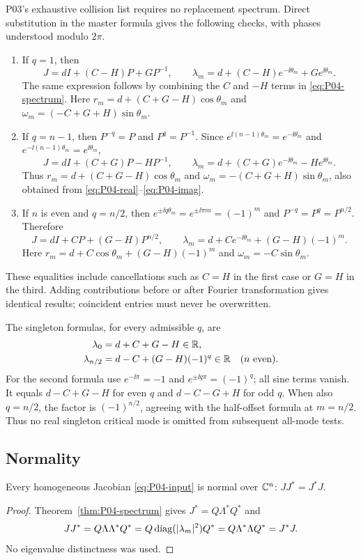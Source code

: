 P03's exhaustive collision list requires no replacement spectrum.
Direct substitution in the master formula gives the following
checks, with phases understood modulo $2\pi$.
\begin{enumerate}[label=(\roman*),leftmargin=*]
\item If $q=1$, then
\[
 J=dI+(C-H)P+GP^{-1},\qquad
 \lambda_m=d+(C-H)e^{-\ii\theta_m}+Ge^{\ii\theta_m}.
\]
The same expression follows by combining the $C$ and $-H$ terms
in \eqref{eq:P04-spectrum}. Here
$r_m=d+(C+G-H)\cos\theta_m$ and
$\omega_m=(-C+G+H)\sin\theta_m$.
\item If $q=n-1$, then $P^{-q}=P$ and $P^q=P^{-1}$.
Since $e^{\ii(n-1)\theta_m}=e^{-\ii\theta_m}$ and
$e^{-\ii(n-1)\theta_m}=e^{\ii\theta_m}$,
\[
 J=dI+(C+G)P-HP^{-1},\qquad
 \lambda_m=d+(C+G)e^{-\ii\theta_m}-He^{\ii\theta_m}.
\]
Thus $r_m=d+(C+G-H)\cos\theta_m$ and
$\omega_m=-(C+G+H)\sin\theta_m$, also obtained from
\eqref{eq:P04-real}--\eqref{eq:P04-imag}.
\item If $n$ is even and $q=n/2$, then
$e^{\pm\ii q\theta_m}=e^{\pm\ii\pi m}=(-1)^m$ and
$P^{-q}=P^q=P^{n/2}$. Therefore
\[
 J=dI+CP+(G-H)P^{n/2},\qquad
 \lambda_m=d+Ce^{-\ii\theta_m}+(G-H)(-1)^m.
\]
Here $r_m=d+C\cos\theta_m+(G-H)(-1)^m$ and
$\omega_m=-C\sin\theta_m$.
\end{enumerate}
These equalities include cancellations such as $C=H$ in the first
case or $G=H$ in the third. Adding contributions before or after
Fourier transformation gives identical results; coincident entries
must never be overwritten.

The singleton formulas, for every admissible $q$, are
\begin{align}
 \lambda_0&=d+C+G-H\in\mathbb{R},\label{eq:P04-zero-mode}\\
 \lambda_{n/2}&=d-C+(G-H)(-1)^q\in\mathbb{R}
       \quad(n\text{ even}).\label{eq:P04-half-mode}
\end{align}
For the second formula use $e^{-\ii\pi}=-1$ and
$e^{\pm\ii q\pi}=(-1)^q$; all sine terms vanish.
It equals $d-C+G-H$ for even $q$ and $d-C-G+H$ for odd $q$.
When also $q=n/2$, the factor is $(-1)^{n/2}$, agreeing with the
half-offset formula at $m=n/2$. Thus no real singleton critical
mode is omitted from subsequent all-mode tests.

\subsection{Normality}
\label{slot:P04-2}

\begin{proposition}[Normality]
\label{prop:P04-normality}
Every homogeneous Jacobian \eqref{eq:P04-input} is normal over
$\mathbb{C}^n$: $JJ^*=J^*J$.
\end{proposition}
\begin{proof}
Theorem~\ref{thm:P04-spectrum} gives $J^*=Q\Lambda^*Q^*$ and
\[
 JJ^*=Q\Lambda\Lambda^*Q^*
       =Q\operatorname{diag}(|\lambda_m|^2)Q^*
       =Q\Lambda^*\Lambda Q^*=J^*J.
\]
No eigenvalue distinctness was used.
\end{proof}

